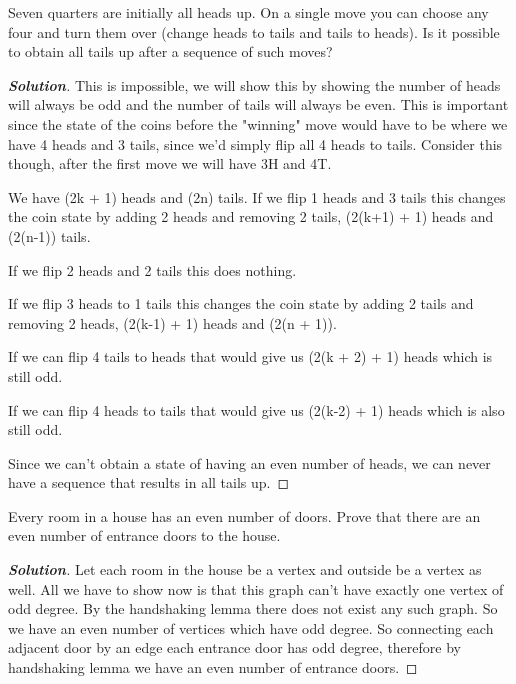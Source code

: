 \documentclass[11pt]{article}
\newenvironment{problem}[2][Problem\!]{\begin{trivlist}
\item[\hskip \labelsep {\bfseries #1}\hskip \labelsep {\bfseries #2}]}{\end{trivlist}}
\newenvironment{solution}{\begin{proof}[\textbf{\textit{Solution}}] }{\end{proof}}
\begin{document}
\begin{tcolorbox}
    \begin{problem}{10/11 IC (46.)} Seven quarters are initially all heads up. On a single move you can choose any four and turn them over (change heads to tails and tails to heads). Is it possible to obtain all tails up after a sequence of such moves?
    \end{problem}
\end{tcolorbox}
\begin{solution}
    This is impossible, we will show this by showing the number of heads will always be odd and the number of tails will always be even. This is important since the state of the coins before the "winning" move would have to be where we have 4 heads and 3 tails, since we'd simply flip all 4 heads to tails.
    Consider this though, after the first move we will have 3H and 4T.

    We have (2k + 1) heads and (2n) tails. If we flip 1 heads and 3 tails this changes the coin state by adding 2 heads and removing 2 tails, (2(k+1) + 1) heads and (2(n-1)) tails.

    If we flip 2 heads and 2 tails this does nothing.

    If we flip 3 heads to 1 tails this changes the coin state by adding 2 tails and removing 2 heads, (2(k-1) + 1) heads and (2(n + 1)). 

    If we can flip 4 tails to heads that would give us (2(k + 2) + 1) heads which is still odd.

    If we can flip 4 heads to tails that would give us (2(k-2) + 1) heads which is also still odd.

    Since we can't obtain a state of having an even number of heads, we can never have a sequence that results in all tails up.
\end{solution}

\begin{tcolorbox}
    \begin{problem}{10/13 IC (50.)} 
        Every room in a house has an even number of doors. Prove that there are an even number of entrance doors to the house. 
    \end{problem}
\end{tcolorbox}
\begin{solution}
    Let each room in the house be a vertex and outside be a vertex as well. All we have to show now is that this graph can't have exactly one vertex of odd degree. By the handshaking lemma there does not exist any such graph. So we have an even number of vertices which have odd degree. So connecting each adjacent door by an edge each entrance door has odd degree, therefore by handshaking lemma we have an even number of entrance doors. 
\end{solution}
\end{document}
